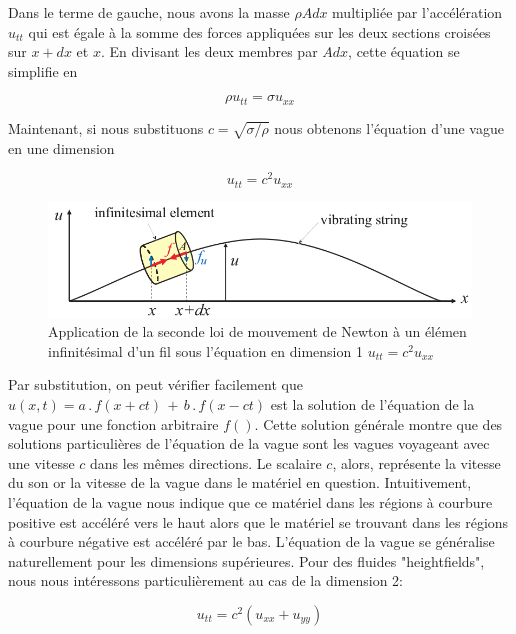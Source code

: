 \documentclass[11pt]{report}
\begin{document}
Dans le terme de gauche, nous avons la masse $\rho A dx$ multipliée par l'accélération $u_{tt}$ qui est égale à la somme des forces appliquées sur les deux sections croisées sur $x+dx$ et $x$. En divisant les deux membres par $A dx$, cette équation se simplifie en

\begin{equation}
\rho u_{tt} = \sigma u_{xx}
\end{equation}

Maintenant, si nous substituons $c = \sqrt{\sigma/\rho}$ nous obtenons l'équation d'une vague en une dimension

\begin{equation}
u_{tt} = c^2 u_{xx}
\end{equation}

\begin{figure}
\includegraphics[scale=0.5]{fil-infinitesimal}
\caption{Application de la seconde loi de mouvement de Newton à un élémen infinitésimal d'un fil sous l'équation en dimension 1 $u_{tt} = c^2 u_{xx}$}
\label{figure/fil-infinitesimal}
\end{figure}

Par substitution, on peut vérifier facilement que $u(x,t) = a\,.\, f(x+ct) \,+\, b\,.\,f(x-ct)$ est la solution de l'équation de la vague pour une fonction arbitraire $f()$. Cette solution générale montre que des solutions particulières de l'équation de la vague sont les vagues voyageant avec une vitesse $c$ dans les mêmes directions. Le scalaire $c$, alors, représente la vitesse du son or la vitesse de la vague dans le matériel en question. Intuitivement, l'équation de la vague nous indique que ce matériel dans les régions à courbure positive est accéléré vers le haut alors que le matériel se trouvant dans les régions à courbure négative est accéléré par le bas. L'équation de la vague se généralise naturellement pour les dimensions supérieures. Pour des fluides "heightfields", nous nous intéressons particulièrement au cas de la dimension 2:

\begin{equation}
u_{tt} = c^2 (u_{xx} + u_{yy})
\end{equation}
\end{document}
